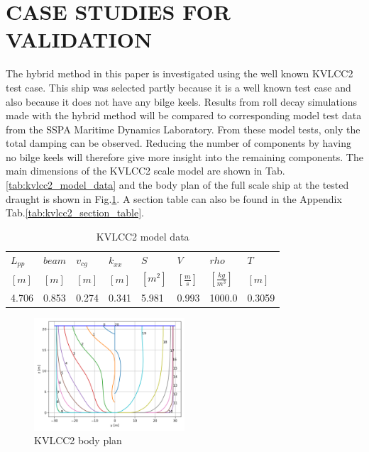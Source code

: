 \section*{CASE STUDIES FOR VALIDATION}\label{case-studies-for-validation}

\label{sec:validation}

    The hybrid method in this paper is investigated using the well known
KVLCC2 test case. This ship was selected partly because it is a well
known test case and also because it does not have any bilge keels.
Results from roll decay simulations made with the hybrid method will be
compared to corresponding model test data from the SSPA Maritime
Dynamics Laboratory. From these model tests, only the total damping can
be observed. Reducing the number of components by having no bilge keels
will therefore give more insight into the remaining components. The main
dimensions of the KVLCC2 scale model are shown in
Tab.\ref{tab:kvlcc2_model_data} and the body plan of the full
scale ship at the tested draught is shown in
Fig.\ref{fig:body_plan}. A section table can also be found in
the Appendix Tab.\ref{tab:kvlcc2_section_table}.

    
 
            
    
    
\begin{table}[H]
\scriptsize
\center
\caption{KVLCC2 model data}
\label{tab:tab:kvlcc2_model_data}
\begin{tabular}{|l|l|l|l|l|l|l|l|}
\hline\addlinespace
$L_{pp}$ & $beam$ & $v_{cg}$ & $k_{xx}$ & $S$ & $V$ & $rho$ & $T$\\ 
$[m]$ & $[m]$ & $[m]$ & $[m]$ & $[m^2]$ & $\left[\frac{m}{s}\right]$ & $\left[\frac{kg}{m^3}\right]$ & $[m]$\\ 
\hline4.706 & 0.853 & 0.274 & 0.341 & 5.981 & 0.993 & 1000.0 & 0.3059\\ 

\hline
\end{tabular}
\end{table}

    

    
 
            
    
    \begin{figure}[H]
        \begin{center}\includegraphics[width = 0.5\textwidth]{figures/body_plan.png}\end{center}
        \vspace{-1cm}
        \caption{KVLCC2 body plan}
        \label{fig:body_plan}
    \end{figure}
    

    
